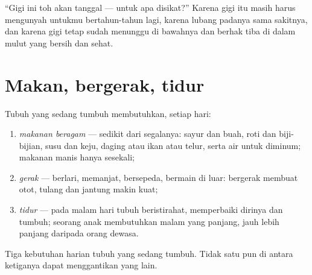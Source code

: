 \begin{remark}\label{rem:g1:healthy-habits:babyteeth}
``Gigi ini toh akan tanggal --- untuk apa disikat?'' Karena gigi itu
masih harus mengunyah untukmu bertahun-tahun lagi, karena lubang
padanya sama sakitnya, dan karena gigi tetap sudah menunggu di
bawahnya dan berhak tiba di dalam mulut yang bersih dan sehat.
\end{remark}

\section{Makan, bergerak, tidur}

\begin{proposition}\label{prop:g1:healthy-habits:needs}
Tubuh yang sedang tumbuh membutuhkan, setiap hari:
\begin{enumerate}
  \item \emph{makanan beragam} --- sedikit dari
        segalanya: sayur dan buah, roti dan biji-bijian, susu dan
        keju, daging atau ikan atau telur, serta air untuk diminum;
        makanan manis hanya sesekali;
  \item \emph{gerak} --- berlari, memanjat, bersepeda,
        bermain di luar: bergerak membuat otot, tulang dan jantung
        makin kuat;
  \item \emph{tidur} --- pada malam hari tubuh
        beristirahat, memperbaiki dirinya dan tumbuh; seorang anak
        membutuhkan malam yang panjang, jauh lebih panjang daripada
        orang dewasa.
\end{enumerate}
\end{proposition}
\admitted

\begin{omfigure}

{\small Tiga kebutuhan harian tubuh yang sedang tumbuh. Tidak satu pun
di antara ketiganya dapat menggantikan yang lain.}
\end{omfigure}

